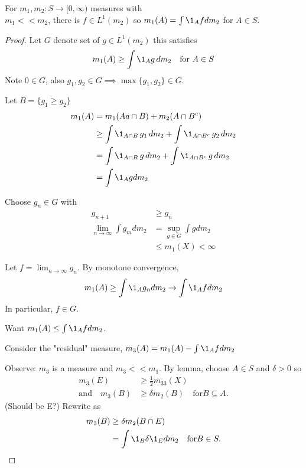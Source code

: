 \begin{theorem}
	For $m_1, m_2 : S \to [0, \infty) $ measures with \\
	$m_1 << m_2$, there is  $f \in L^1 (m_2)$ so
	$m_1 (A) = \int \1_A f dm_2$ for $A \in S$.
\end{theorem}

\begin{proof}
	Let $G$ denote set of $g \in L^1 (m_2)$ this satisfies
	\begin{align*}
		m_1 (A) \geq \int \1_A g \, dm_2 \quad \text{for } A \in S
	\end{align*} 
	Note $0 \in G$, also
	$g_1 , g_2 \in G \implies \max \{g_1, g_2\} \in G$.

	Let $B = \{g_1 \geq g_2\}$
	\begin{align*}
		m_1 (A) &= m_1 (Aa \cap B) + m_2 (A \cap B^c) \\
				&\geq \int \1_{A \cap B} \, g_1 \, d m_2 + \int \1_{A \cap B^c} \, g_2 \, dm_2 \\
				&= \int \1_{A \cap B} \, g \, d m_2 + \int \1_{A \cap B^c} \, g \, dm_2 \\
				&= \int \1_A g dm_2
	\end{align*} 

	Choose $g_n \in G$ with 
	\begin{align*}
		g_{n+1} &\geq g_n \\
		\lim_{n \to \infty} \int g_{m} d m_2 &= \sup_{g \in G} \int g dm_2 \\
											 &\leq m_1 (X) < \infty
	\end{align*}

	Let $f = \lim_{n\to \infty} g_n$. By monotone convergence,
	\begin{align*}
		m_1 (A) \geq \int \1_A g_n dm_2 \to \int \1_{A} f dm_2
	\end{align*} In particular, $f \in G$.

	Want $m_1 (A) \leq \int \1_{A} f dm_2$.

	Consider the "residual" measure, $m_3 (A) = m_1 (A) - \int \1_{A} f dm_2$
	
	Observe: $m_3$ is a measure and $m_3 << m_1$. 
	By lemma, choose $A \in S$ and $\delta > 0$ so
	\begin{align*}
							m_3 (E) &\geq \frac{1}{2} m_33 (X) \\
		\text{and} \quad 	m_3 (B) &\geq \delta m_2 (B) \quad \text{for} B \subseteq A. 
	\end{align*} (Should be E?)
	Rewrite as 
	\begin{align*}
		m_3 (B) &\geq \delta m_2 ( B \cap E) \\
				&= \int \1_{B} \delta \1_E d m_2 \quad \text{for} B \in S. 
	\end{align*} 


\end{proof}
